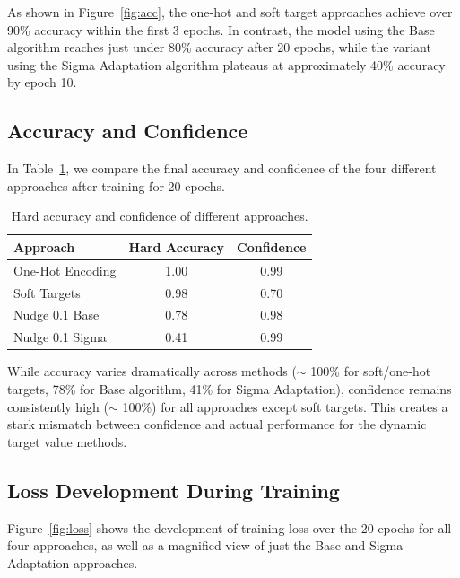 \documentclass[12pt,fleqn,a4paper]{article}
\begin{document}
As shown in Figure~\ref{fig:acc}, the one-hot and soft target approaches achieve over 90\% accuracy within the first 3 epochs. In contrast, the model using the Base algorithm reaches just under 80\% accuracy after 20 epochs, while the variant using the Sigma Adaptation algorithm plateaus at approximately 40\% accuracy by epoch 10.

\subsection{Accuracy and Confidence}
In Table~\ref{tab:accuracy_confidence}, we compare the final accuracy and confidence of the four different approaches after training for 20 epochs.
\begin{table}[h!]
\centering
\caption{Hard accuracy and confidence of different approaches.}
\begin{tabular}{lcc}
\hline
\textbf{Approach} & \textbf{Hard Accuracy} & \textbf{Confidence} \\
\hline
One-Hot Encoding   & 1.00 & 0.99 \\
Soft Targets       & 0.98 & 0.70 \\
Nudge 0.1 Base     & 0.78 & 0.98 \\
Nudge 0.1 Sigma    & 0.41 & 0.99 \\
\hline
\end{tabular}
\label{tab:accuracy_confidence}
\end{table}

While accuracy varies dramatically across methods ($\sim$ 100\% for soft/one-hot targets, 78\% for Base algorithm, 41\% for Sigma Adaptation), confidence remains consistently high ($\sim$ 100\%) for all approaches except soft targets. This creates a stark mismatch between confidence and actual performance for the dynamic target value methods.

\subsection{Loss Development During Training}
Figure~\ref{fig:loss} shows the development of training loss over the 20 epochs for all four approaches, as well as a magnified view of just the Base and Sigma Adaptation approaches.
\end{document}
